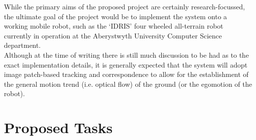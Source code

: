 \documentclass[10pt,fleqn,twoside]{article}
\begin{document}
While the primary aims of the proposed project are certainly research-focussed, the ultimate goal of the project would be to implement the system onto a working mobile robot, such as the `IDRIS' four wheeled all-terrain robot currently in operation at the Aberystwyth University Computer Science department. \\

Although at the time of writing there is still much discussion to be had as to the exact implementation details, it is generally expected that the system will adopt image patch-based tracking and correspondence to allow for the establishment of the general motion trend (i.e. optical flow) of the ground (or the egomotion of the robot).



\section{Proposed Tasks}

\end{document}
